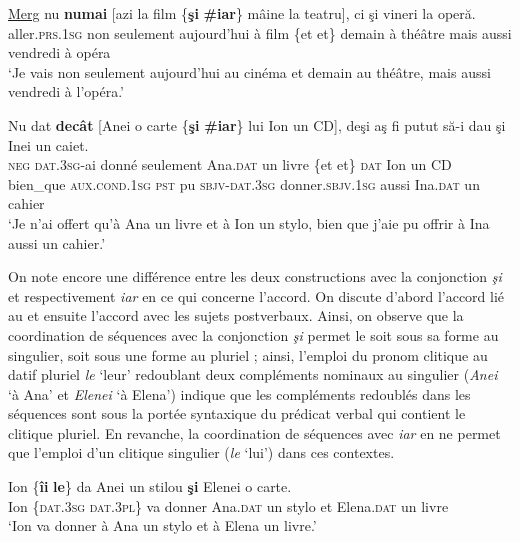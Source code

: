 \ex 
\gll \uline{Merg} nu \textbf{numai}  [azi  la  film  \{\textbf{şi} {\textbar} \textbf{\#iar}\}  mâine  la  teatru], ci  şi  vineri  la  operă. \label{ch2:ex305b}\\ 
aller.\textsc{prs.1sg}  non  seulement  aujourd’hui  à  film  \{et {\textbar} et\}  demain  à  théâtre mais  aussi  vendredi  à  opéra\\
\glt ‘Je vais non seulement aujourd’hui au cinéma et demain au théâtre, mais aussi vendredi à l’opéra.’ 

\ex
\gll Nu  dat \textbf{decât} [Anei  o  carte  \{\textbf{şi} {\textbar} \textbf{\#iar}\}  lui  Ion  un  CD], deşi  aş  fi  putut  să-i  dau  şi  Inei  un caiet. \label{ch2:ex305c}\\ 
\textsc{neg} \textsc{dat.3sg}{}-ai  donné  seulement  Ana.\textsc{dat}  un  livre  \{et {\textbar} et\}  \textsc{dat} Ion  un  CD bien\_que  \textsc{aux.cond.1sg} \textsc{pst} pu  \textsc{sbjv-dat.3sg}  donner.\textsc{sbjv.1sg}  aussi  Ina.\textsc{dat}  un cahier\\
\glt ‘Je n’ai offert qu’à Ana un livre et à Ion un stylo, bien que j’aie pu offrir à Ina aussi un cahier.’  
\z
\z

On note encore une différence entre les deux constructions avec la conjonction \textit{şi} et respectivement \textit{iar} en ce qui concerne l’accord. On discute d’abord l’accord lié au  et ensuite l’accord avec les sujets postverbaux. Ainsi, on observe que la coordination de séquences avec la conjonction \textit{şi} permet le  soit sous sa forme au singulier, soit sous une forme au pluriel  ; ainsi, l’emploi du pronom clitique au datif pluriel \textit{le} ‘leur’ redoublant deux compléments nominaux au singulier (\textit{Anei} ‘à Ana’ et \textit{Elenei} ‘à Elena’) indique que les compléments redoublés dans les séquences sont sous la portée syntaxique du prédicat verbal qui contient le clitique pluriel. En revanche, la coordination de séquences avec \textit{iar} en  ne permet que l’emploi d’un clitique singulier (\textit{le} ‘lui’) dans ces contextes. 

\ea \label{ch2:ex306}
\ea 
\gll Ion  \{\textbf{îi} {\textbar} \textbf{le}\}    da  Anei  un  stilou  \textbf{şi}  Elenei  o  carte. \label{ch2:ex306a}\\
Ion  \{\textsc{dat.3sg} {\textbar} \textsc{dat.3pl}\} va  donner  Ana.\textsc{dat}  un  stylo  et  Elena.\textsc{dat}  un  livre\\
\glt ‘Ion va donner à Ana un stylo et à Elena un livre.’

